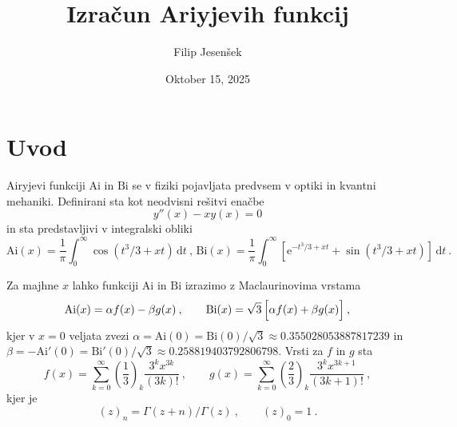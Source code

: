 \documentclass{article}
\author{Filip Jesenšek}
\date{Oktober 15, 2025}
\newcommand{\Ai}{\mathrm{Ai}}
\newcommand{\Bi}{\mathrm{Bi}}
\newcommand{\dd}{\,\mathrm{d}}
\theoremstyle{definition}
\theoremstyle{plain}
\numberwithin{definition}{section}
\numberwithin{theorem}{section} \title{Izračun Ariyjevih funkcij}
\begin{document}
\maketitle

\newpage

\tableofcontents

\newpage

\section{Uvod}

Airyjevi funkciji $\Ai$ in $\Bi$
se v fiziki pojavljata predvsem v optiki in kvantni mehaniki.  Definirani sta kot neodvisni rešitvi enačbe
%
\begin{equation*}
  y''(x) -xy(x) = 0
\end{equation*}
%
in sta predstavljivi v integralski obliki
%
\begin{equation*}
  \Ai(x) = \frac{1}{\pi} \int_0^\infty \cos (t^3/3 + x t) \dd t \>, \,
  \Bi(x) = \frac{1}{\pi} \int_0^\infty \left[ \mathrm{e}^{-t^3/3 + x t}
  + \sin (t^3/3 + x t) \right] \dd t \>.
\end{equation*}

Za majhne $x$ lahko funkciji $\Ai$ in $\Bi$ izrazimo
z Maclaurinovima vrstama
%
\begin{equation*}
  \Ai(x) = \alpha f(x) - \beta g(x)\>,\qquad
  \Bi(x) = \sqrt{3}\, \Bigl[\alpha f (x) + \beta g(x) \Bigr]\>,
\end{equation*}
kjer v $x=0$ veljata zvezi
%
$\alpha = \Ai(0) = \Bi(0)/\sqrt{3}\approx 0.355028053887817239$ in
$\beta = -\Ai'(0) = \Bi'(0)/\sqrt{3}\approx 0.258819403792806798$.
Vrsti za $f$ in $g$ sta
\begin{equation*}
  f(x) = \sum_{k=0}^\infty
  \left(\frac{1}{3}\right)_k \frac{3^k x^{3k}}{(3k)!} \>, \qquad
  g(x) = \sum_{k=0}^\infty
  \left(\frac{2}{3}\right)_k \frac{3^k x^{3k+1}}{(3k+1)!} \>,
\end{equation*}
kjer je
\begin{equation*}
  (z)_n = \Gamma(z+n)/\Gamma(z) \>, \qquad (z)_0 = 1 \>.
\end{equation*}
\end{document}
